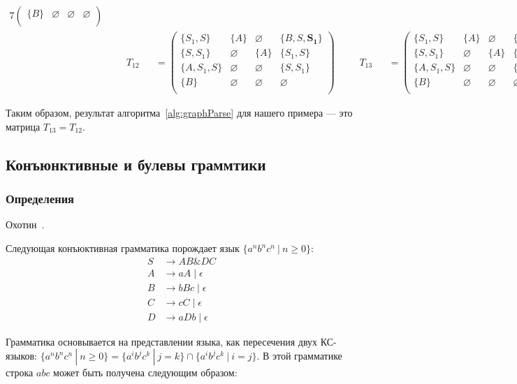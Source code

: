 \begin{example}
\begin{alignat*}{7}
\begin{pmatrix}
\{B\}       & \varnothing & \varnothing & \varnothing \\
\end{pmatrix} \\ & &&T_{12} &&= \begin{pmatrix}
\{S_1, S\}     & \{A\}       & \varnothing & \{B, S, \pmb{S_1}\}    \\
\{S, S_1\}       & \varnothing & \{A\}       & \{S_1, S\}     \\
\{A, S_1, S\}  & \varnothing & \varnothing & \{S, S_1\} \\
\{B\}       & \varnothing & \varnothing & \varnothing \\
\end{pmatrix} \ \ \ \ &&T_{13} &&= \begin{pmatrix}
\{S_1, S\}     & \{A\}       & \varnothing & \{B, S, S_1\}    \\
\{S, S_1\}       & \varnothing & \{A\}       & \{S_1, S\}     \\
\{A, S_1, S\}  & \varnothing & \varnothing & \{S, S_1\} \\
\{B\}       & \varnothing & \varnothing & \varnothing \\
\end{pmatrix}
\end{alignat*}

Таким образом, результат алгоритма~\ref{alg:graphParse} для нашего примера --- это матрица $T_{13} = T_{12}$. 

\end{example}

\subsection{Конъюнктивные и булевы граммтики}

\subsubsection{Определения}

Охотин~\cite{Okhotin:2003:BG:1758089.1758123,f60a33d409364914be560cac0e54b12c,Okhotin:2014:PMM:2565359.2565379}.
\begin{example}
	Следующая конъюктивная грамматика порождает язык $ \{a^nb^nc^n~|~n \geq 0\}$:
	\begin{align*}
	S   &\to A B \& D C \\ 
	A  &\to a A \mid \epsilon \\ 
	B &\to b B c \mid \epsilon \\
	C   &\to c C \mid \epsilon \\ 
	D   &\to aDb \mid \epsilon
	\end{align*}
	
	Грамматика основывается на представлении языка, как пересечения двух КС-языков: $\{a^nb^nc^n~|~n \geq 0\}=\{a^ib^jc^k~|~j = k\} \cap \{a^ib^jc^k~|~i = j\}$. В этой грамматике строка $abc$ может быть получена следующим образом:
\end{example}
